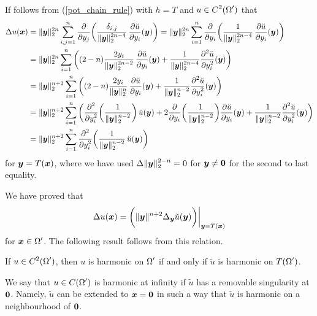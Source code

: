 If follows from (\ref{pot_chain_rule}) with $h=T$ and
$\DS u\in C^2(\Omega^{\prime})$ that
\begin{align*}
\Delta u (\VEC{x})
&= \|\VEC{y}\|_2^{2n}  \sum_{i,j=1}^n
\pdfdx{ \left( \frac{ \delta_{i,j}}{\|\VEC{y}\|_2^{2n-4}}
\, \pdydx{\breve{u}}{y_i}(\VEC{y})\right)}{y_j}
= \|\VEC{y}\|_2^{2n}  \sum_{i=1}^n
\pdfdx{ \left( \frac{1}{\|\VEC{y}\|_2^{2n-4}}
\, \pdydx{\breve{u}}{y_i}(\VEC{y})\right)}{y_i} \\
&= \|\VEC{y}\|_2^{2n}  \sum_{i=1}^n
\left( (2-n) \frac{2y_i}{\|\VEC{y}\|_2^{2n-2}}\,
\pdydx{\breve{u}}{y_i}(\VEC{y})
+ \frac{1}{\|\VEC{y}\|_2^{2n-4}} \pdydxn{\breve{u}}{y_i}{2} (\VEC{y})
\right) \\
&= \|\VEC{y}\|_2^{n+2}  \sum_{i=1}^n
\left( (2-n) \frac{2y_i}{\|\VEC{y}\|_2^n}\,
\pdydx{\breve{u}}{y_i}(\VEC{y})
+ \frac{1}{\|\VEC{y}\|_2^{n-2}} \pdydxn{\breve{u}}{y_i}{2} (\VEC{y})
\right) \\
&= \|\VEC{y}\|_2^{n+2}  \sum_{i=1}^n
\left( \pdfdxn{ \left( \frac{1}{\|\VEC{y}\|_2^{n-2}} \right)}{y_i}{2}
  \, \breve{u}(\VEC{y})
+ 2\pdfdx{ \left( \frac{1}{\|\VEC{y}\|_2^{n-2}} \right)}{y_i}
\pdydx{\breve{u}}{y_i}(\VEC{y})
+ \frac{1}{\|\VEC{y}\|_2^{n-2}} \pdydxn{\breve{u}}{y_i}{2} (\VEC{y})
\right) \\
&= \|\VEC{y}\|_2^{n+2}  \sum_{i=1}^n
\pdfdxn{ \left( \frac{1}{\|\VEC{y}\|_2^{n-2}}
\, \breve{u}(\VEC{y}) \right)}{y_i}{2}
\end{align*}
for $\VEC{y} = T(\VEC{x})$, where we have used
$\DS \Delta \|\VEC{y}\|_2^{2-n} = 0$ for
$\VEC{y} \neq \VEC{0}$ for the second to last equality.

We have proved that
\[
\Delta u (\VEC{x}) =
\bigg( \|\VEC{y}\|^{n+2} \Delta_{\VEC{y}} \tilde{u}(\VEC{y}) \bigg)
\bigg|_{\VEC{y} = T(\VEC{x})}
\]
for $\DS \VEC{x} \in \Omega^{\prime}$.
The following result follows from this relation.

\begin{prop} \label{pot_u_ut_harm}
If $\DS u\in C^2(\Omega^{\prime})$, then $u$ is harmonic on
$\DS \Omega^{\prime}$
if and only if $\tilde{u}$ is harmonic on $\DS T(\Omega^{\prime})$.
\end{prop}

\begin{defn}
We say that $\DS u\in C(\Omega^{\prime})$ is harmonic at
infinity if $\tilde{u}$ has a removable singularity at $\VEC{0}$.
Namely, $\tilde{u}$ can be extended to $\VEC{x}=\VEC{0}$ in such a way
that $\tilde{u}$ is harmonic on a neighbourhood of $\VEC{0}$.
\end{defn}

